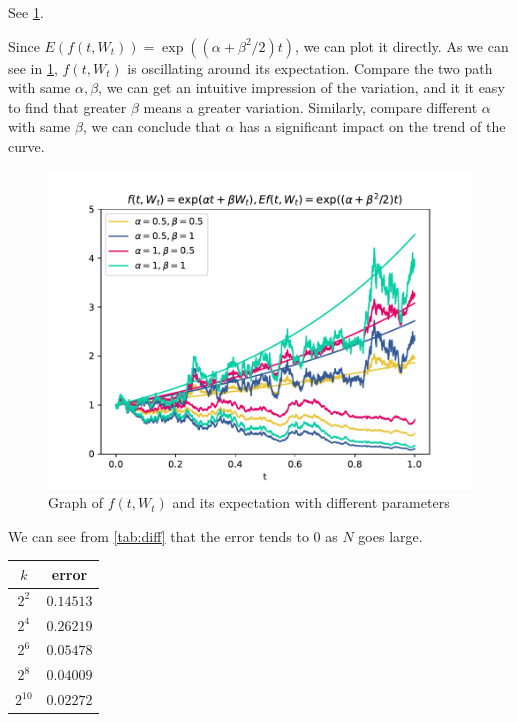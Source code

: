\problem
\begin{subproblem}[(\arabic*)]
    \item See \cref{fig:GBM}.
    \item Since $E(f(t,W_t))=\exp((\alpha+\beta^2/2)t)$, we can
    plot it directly. As we can see in \cref{fig:GBM},
    $f(t,W_t)$ is oscillating around its expectation.
    Compare the two path with same $\alpha,\beta$, we can
    get an intuitive impression of the variation, and it
    it easy to find that
    greater $\beta$ means a greater variation.
    Similarly, compare different $\alpha$ with same $\beta$,
    we can conclude that $\alpha$ has a significant impact on 
    the trend of the curve.

    \begin{figure}[h]
        \centering
        \includegraphics[width=\textwidth]{GBM}
        \caption{Graph of $f(t,W_t)$ and its expectation with different
        parameters}
        \label{fig:GBM}
    \end{figure}
\end{subproblem}

\problem
We can see from \cref{tab:diff} that the error tends to 0 as $N$ goes large.

\begin{margintable}
    \centering
    \begin{tabular}{cc}
        \toprule
        $k$ & error \\
        \midrule
        $2^{2}$ & $0.14513$\\
        $2^{4}$ & $0.26219$\\
        $2^{6}$ & $0.05478$\\
        $2^{8}$ & $0.04009$\\
        $2^{10}$ & $0.02272$\\
        \bottomrule
    \end{tabular}
    \caption{Difference Between It\^o and Stratonovich Integral}
    \label{tab:diff}
\end{margintable}

